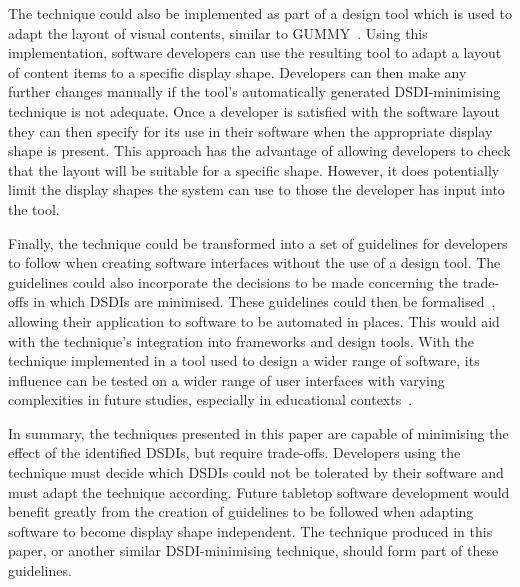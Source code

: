 \documentclass[twocolumn,compsoc]{cvm}
\begin{document}
{The technique could also be implemented as part of a design tool which is used to adapt the layout of visual contents, similar to GUMMY~\cite{Meskens2008}.
Using this implementation, software developers can use the resulting tool to adapt a layout of content items to a specific display shape.
Developers can then make any further changes manually if the tool's automatically generated \ac{DSDI}-minimising technique is not adequate.
Once a developer is satisfied with the software layout they can then specify for its use in their software when the appropriate display shape is present.
This approach has the advantage of allowing developers to check that the layout will be suitable for a specific shape.
However, it does potentially limit the display shapes the system can use to those the developer has input into the tool.

Finally, the technique could be transformed into a set of guidelines for developers to follow when creating software interfaces without the use of a design tool.
The guidelines could also incorporate the decisions to be made concerning the trade-offs in which \acp{DSDI} are minimised.
These guidelines could then be formalised~\cite{Ngo2000}, allowing their application to software to be automated in places.
This would aid with the technique's integration into frameworks and design tools.
With the technique implemented in a tool used to design a wider range of software, its influence can be tested on a wider range of user interfaces with varying complexities in future studies, especially in educational contexts~\cite{McNaughton2017,jg-et-al:2017}.

In summary, the techniques presented in this paper are capable of minimising the effect of the identified \acp{DSDI}, but require trade-offs.
Developers using the technique must decide which \acp{DSDI} could not be tolerated by their software and must adapt the technique according.
Future tabletop software development would benefit greatly from the creation of guidelines to be followed when adapting software to become display shape independent.
The technique produced in this paper, or another similar \ac{DSDI}-minimising technique, should form part of these guidelines.




}
\end{document}
